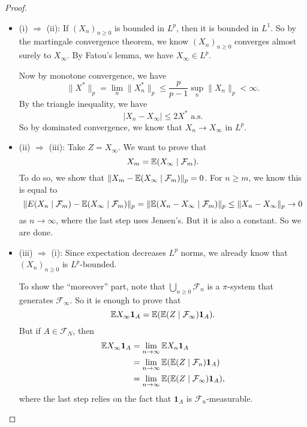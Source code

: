 \documentclass[a4paper]{article}
\begin{document}
\begin{proof}\leavevmode
  \begin{itemize}
    \item (i) $\Rightarrow$ (ii): If $(X_n)_{n \geq 0}$ is bounded in $L^p$, then it is bounded in $L^1$. So by the martingale convergence theorem, we know $(X_n)_{n \geq 0}$ converges almost surely to $X_\infty$. By Fatou's lemma, we have $X_\infty \in L^p$.

      Now by monotone convergence, we have
      \[
        \|X^*\|_p = \lim_n \|X_n^*\|_p \leq \frac{p}{p - 1} \sup_n \|X_n\|_p < \infty.
      \]
      By the triangle inequality, we have
      \[
        |X_n - X_\infty| \leq 2 X^*\text{ a.s.}
      \]
      So by dominated convergence, we know that $X_n \to X_\infty$ in $L^p$.
    \item (ii) $\Rightarrow$ (iii): Take $Z = X_\infty$. We want to prove that
      \[
        X_m = \mathbb{E}(X_\infty \mid \mathcal{F}_m).
      \]
      To do so, we show that $\|X_m - \mathbb{E}(X_\infty \mid \mathcal{F}_m)\|_p = 0$. For $n \geq m$, we know this is equal to
      \[
        \|E(X_n \mid \mathcal{F}_m) - \mathbb{E}(X_\infty \mid \mathcal{F}_m)\|_p = \|\mathbb{E}(X_n - X_\infty \mid \mathcal{F}_m)\|_p \leq \|X_n - X_\infty\|_p \to 0
      \]
      as $n \to \infty$, where the last step uses Jensen's. But it is also a constant. So we are done.
    \item (iii) $\Rightarrow$ (i): Since expectation decreases $L^p$ norms, we already know that $(X_n)_{n \geq 0}$ is $L^p$-bounded.

      To show the ``moreover'' part, note that $\bigcup_{n \geq 0} \mathcal{F}_n$ is a $\pi$-system that generates $\mathcal{F}_\infty$. So it is enough to prove that
      \[
        \mathbb{E} X_\infty \mathbf{1}_A = \mathbb{E}(\mathbb{E}(Z \mid \mathcal{F}_\infty) \mathbf{1}_A).
      \]
      But if $A \in \mathcal{F}_N$, then
      \begin{align*}
        \mathbb{E} X_\infty \mathbf{1}_A &= \lim_{n \to \infty} \mathbb{E} X_n \mathbf{1}_A\\
        &= \lim_{n \to \infty} \mathbb{E}(\mathbb{E}(Z \mid \mathcal{F}_n) \mathbf{1}_A)\\
        &= \lim_{n \to \infty} \mathbb{E} (\mathbb{E}(Z \mid \mathcal{F}_\infty)\mathbf{1}_A),
      \end{align*}
      where the last step relies on the fact that $\mathbf{1}_A$ is $\mathcal{F}_n$-measurable.\qedhere
  \end{itemize}
\end{proof}
\end{document}
